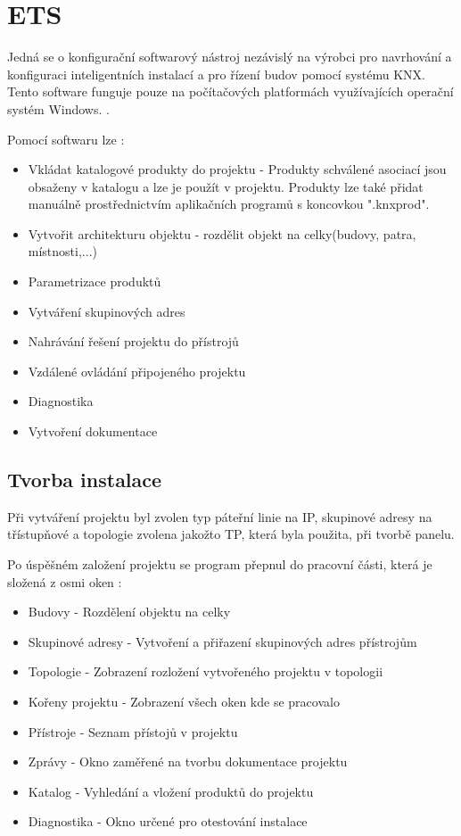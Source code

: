 \chapter{ETS}
\label{ETS}
Jedná se o konfigurační softwarový nástroj nezávislý na výrobci pro navrhování a konfiguraci inteligentních instalací a pro řízení budov pomocí systému KNX. Tento software funguje pouze na počítačových platformách využívajících operační systém Windows. \cite{ETS Kecy}.

Pomocí softwaru lze \cite{Mitrenga}:
\begin{itemize}
    \item Vkládat katalogové produkty do projektu - Produkty schválené asociací jsou obsaženy v katalogu a lze je použít v projektu. Produkty lze také přidat manuálně prostřednictvím aplikačních programů s koncovkou ".knxprod".
    \item Vytvořit architekturu objektu - rozdělit objekt na celky(budovy, patra, místnosti,...)
    \item Parametrizace produktů
    \item Vytváření skupinových adres
    \item Nahrávání řešení projektu do přístrojů
    \item Vzdálené ovládání připojeného projektu
    \item Diagnostika
    \item Vytvoření dokumentace
\end{itemize}

\section{Tvorba instalace}
Při vytváření projektu byl zvolen typ páteřní linie na IP, skupinové adresy na třístupňové a topologie zvolena jakožto TP, která byla použita, při tvorbě panelu.

Po úspěšném založení projektu se program přepnul do pracovní části, která je složená z osmi oken \cite{Mitrenga}:
\begin{itemize}
    \item Budovy - Rozdělení objektu na celky
    \item Skupinové adresy - Vytvoření a přiřazení skupinových adres přístrojům
    \item Topologie - Zobrazení rozložení vytvořeného projektu v topologii
    \item Kořeny projektu - Zobrazení všech oken kde se pracovalo
    \item Přístroje - Seznam přístojů v projektu
    \item Zprávy - Okno zaměřené na tvorbu dokumentace projektu
    \item Katalog - Vyhledání a vložení produktů do projektu
    \item Diagnostika - Okno určené pro otestování instalace\\
\end{itemize}

